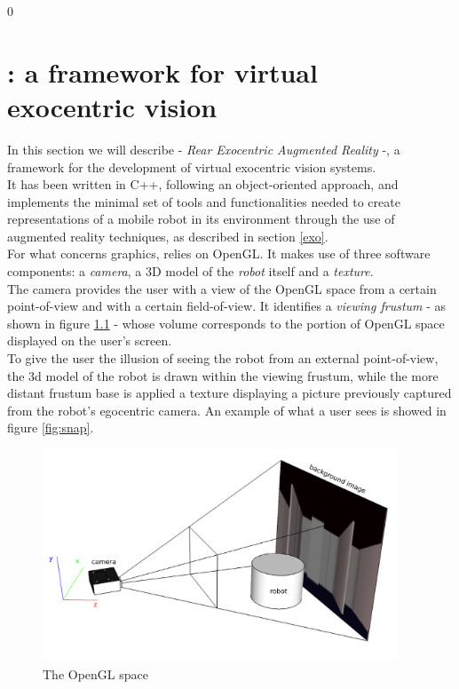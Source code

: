 \setcounter{figure}{0}
\setcounter{table}{0}
\setcounter{lstlisting} {0}

\chapter{\framework{}: a framework for virtual exocentric vision}
\label{rear}
\minitoc

In this section we will describe \framework{} - 
\textit{Rear Exocentric Augmented Reality} -, a framework 
for the development of virtual exocentric vision systems.
\\
It has been written in C++, following an object-oriented 
approach, and implements the minimal set of tools and functionalities 
needed to create representations of a mobile robot in its environment 
through the use of augmented reality techniques, as described in 
section \ref{exo}.
\\
For what concerns graphics, \framework{} relies on OpenGL.
It makes use of three software components: a \textit{camera}, 
a 3D model of the \textit{robot} itself and a \textit{texture}.
\\
The camera provides the user with a view of the OpenGL space 
from a certain point-of-view and with a certain field-of-view. 
It identifies a \textit{viewing frustum} - as shown in figure 
\ref{fig:openglspace} - whose volume corresponds to the 
portion of OpenGL space displayed on the user's screen.
\\
To give the user the illusion of seeing the robot from an 
external point-of-view, the 3d model of the robot is drawn 
within the viewing frustum, while the more distant frustum base 
is applied a texture displaying a picture previously 
captured from the robot's egocentric camera.
An example of what a user sees is showed in figure \ref{fig:snap}.
\begin{figure}[!h]
  \begin{center}
    \includegraphics[width=300pt]{img/camera_frustum_scheme.png}
    \caption{The OpenGL space}
    \label{fig:openglspace}
  \end{center}
\end{figure}
